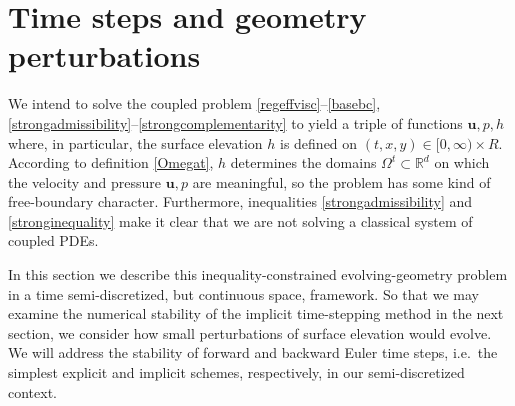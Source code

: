 \documentclass[letterpaper,final,12pt,reqno]{amsart}
\newcommand{\RR}{\mathbb{R}}
\newcommand{\bu}{\mathbf{u}}
\begin{document}
\section{Time steps and geometry perturbations} \label{sec:perturb}

We intend to solve the coupled problem \eqref{regeffvisc}--\eqref{basebc}, \eqref{strongadmissibility}--\eqref{strongcomplementarity} to yield a triple of functions $\bu,p,h$ where, in particular, the surface elevation $h$ is defined on $(t,x,y) \in [0,\infty)\times R$.  According to definition \eqref{Omegat}, $h$ determines the domains $\Omega^t\subset \RR^d$ on which the velocity and pressure $\bu,p$ are meaningful, so the problem has some kind of free-boundary character.  Furthermore, inequalities \eqref{strongadmissibility} and \eqref{stronginequality} make it clear that we are not solving a classical system of coupled PDEs.

In this section we describe this inequality-constrained evolving-geometry problem in a time semi-discretized, but continuous space, framework.  So that we may examine the numerical stability of the implicit time-stepping method in the next section, we consider how small perturbations of surface elevation would evolve.  We will address the stability of forward and backward Euler time steps, i.e.~the simplest explicit and implicit schemes, respectively, in our semi-discretized context.
\end{document}
